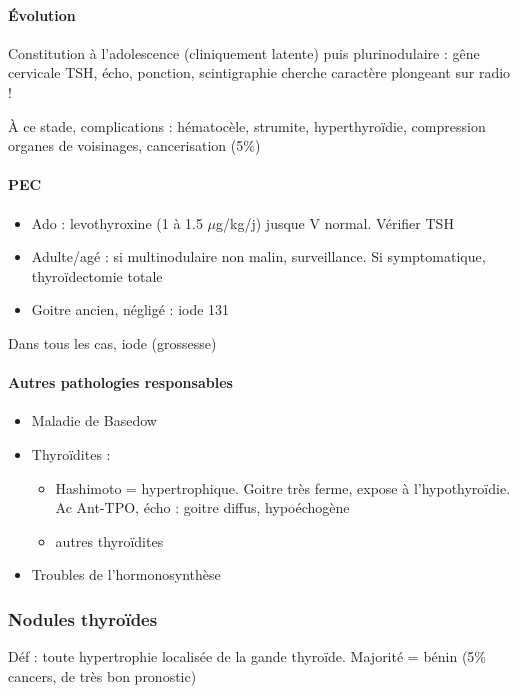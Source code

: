 \documentclass[11pt]{article}
\begin{document}
\paragraph{Évolution}
\label{sec:org40f68a7}
Constitution à l'adolescence (cliniquement latente) puis plurinodulaire : gêne
cervicale \thus TSH, écho, ponction, scintigraphie
\danger cherche caractère plongeant sur radio !

À ce stade, complications : hématocèle, strumite, hyperthyroïdie, compression
organes de voisinages, cancerisation (5\%)

\paragraph{PEC}
\label{sec:orgaea0d79}
\begin{itemize}
\item Ado : levothyroxine (1 à 1.5 \(\mu\)g/kg/j) jusque V normal. Vérifier TSH
\item Adulte/agé : si multinodulaire non malin, surveillance. Si symptomatique,
thyroïdectomie totale
\item Goitre ancien, négligé : iode 131
\end{itemize}
Dans tous les cas, \inc iode (grossesse)

\paragraph{Autres pathologies responsables}
\label{sec:org170e477}
\begin{itemize}
\item Maladie de Basedow
\item Thyroïdites : 
\begin{itemize}
\item Hashimoto = hypertrophique. Goitre très ferme, expose à l'hypothyroïdie. Ac Ant-TPO\inc\inc{}, écho : goitre diffus, hypoéchogène
\item autres thyroïdites
\end{itemize}
\item Troubles de l'hormonosynthèse
\end{itemize}

\subsubsection{Nodules thyroïdes}
\label{sec:org6572fa8}
Déf : toute hypertrophie localisée de la gande thyroïde. Majorité = bénin (5\%
cancers, de très bon pronostic)
\end{document}

